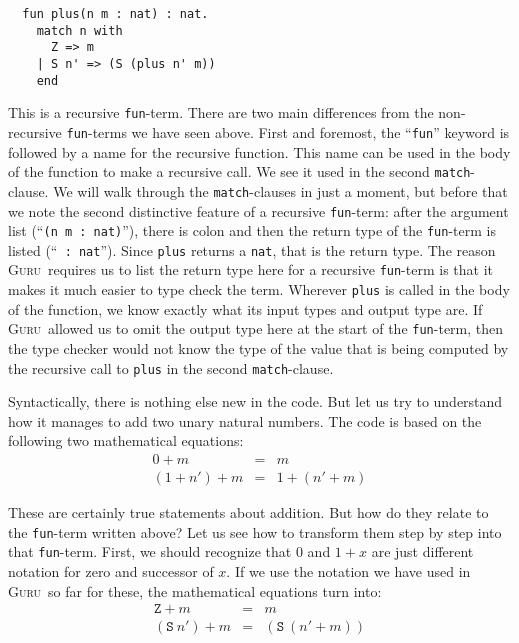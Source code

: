 \documentclass{book}[12pt]
\newcommand{\guru}[0]{\textsc{Guru}}
\begin{document}
\begin{verbatim}
  fun plus(n m : nat) : nat.
    match n with
      Z => m
    | S n' => (S (plus n' m))
    end
\end{verbatim}

\noindent This is a recursive \texttt{fun}-term.  There are two main
differences from the non-recursive \texttt{fun}-terms we have seen
above.  First and foremost, the ``\texttt{fun}'' keyword is followed
by a name for the recursive function.  This name can be used in the
body of the function to make a recursive call.  We see it used in the
second \texttt{match}-clause.  We will walk through the
\texttt{match}-clauses in just a moment, but before that we note the
second distinctive feature of a recursive \texttt{fun}-term: after the
argument list (``\texttt{(n m : nat)}''), there is colon and then the
return type of the \texttt{fun}-term is listed (``\texttt{ : nat}'').
Since \texttt{plus} returns a \texttt{nat}, that is the return type.
The reason \guru\ requires us to list the return type here for a
recursive \texttt{fun}-term is that it makes it much easier to type
check the term.  Wherever \texttt{plus} is called in the body of the
function, we know exactly what its input types and output type are.
If \guru\ allowed us to omit the output type here at the start of the
\texttt{fun}-term, then the type checker would not know the type of
the value that is being computed by the recursive call to
\texttt{plus} in the second \texttt{match}-clause.

Syntactically, there is nothing else new in the code.  But let us try
to understand how it manages to add two unary natural numbers.  The
code is based on the following two mathematical equations:
\begin{eqnarray*}
0+ m & = & m \\
(1+n')+m & = & 1+(n'+m)
\end{eqnarray*}

\noindent These are certainly true statements about addition.  But
how do they relate to the \texttt{fun}-term written above?  Let us
see how to transform them step by step into that \texttt{fun}-term.
First, we should recognize that $0$ and $1+x$ are just different
notation for zero and successor of $x$.  If we use the notation we
have used in \guru\ so far for these, the mathematical equations
turn into:
\begin{eqnarray*}
\texttt{Z}+ m & = & m \\
(\texttt{S}\ n')+m & = & (\texttt{S}\ (n'+m))
\end{eqnarray*}
\end{document}
